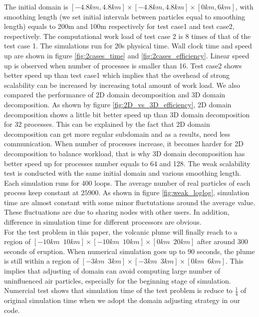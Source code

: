 \documentclass[conference,compsoc]{IEEEtran}
\begin{document}
%
The initial domain is $[-4.8km,4.8km]\times [-4.8km,4.8km] \times [0km, 6km]$, with smoothing length (we set initial intervals between particles equal to smoothing length) equals to 200m and 100m respectively for test case1 and test case2, respectively. The computational work load of test case 2 is 8 times of that of the test case 1. The simulations run for 20s physical time.  Wall clock time and speed up are shown in figure \ref{fig:2cases_time} and \ref{fig:2cases_efficiency}. Linear speed up is observed when number of processes is smaller than 16. Test case2 shows better speed up than test case1 which implies that the overhead of strong scalability can be increased by increasing total amount of work load. We also compared the performance of 2D domain decomposition and 3D domain decomposition. As shown by figure \ref{fig:2D_vs_3D_efficiency}, 2D domain decomposition shows a little bit better speed up than 3D domain decomposition for 32 processes. This can be explained by the fact that 2D domain decomposition can get more regular subdomain and as a results, need less communication. When number of processes increase, it becomes harder for 2D decomposition to balance workload, that is why 3D domain decomposition has better speed up for processes number equals to 64 and 128. The weak scalability test is conducted with the same initial domain and various smoothing length. Each simulation runs for 400 loops. The average number of real particles of each process keep constant at $25900$. As shown in figure \ref{fig:weak_loglog}, simulation time are almost constant with some minor fluctutations around the average value. These fluctuations are due to sharing nodes with other users. In addition, difference in simulation time for different processors are obvious.\\
%
%
For the test problem in this paper, the volcanic plume will finally reach to a region of $[-10km \,\,\, 10km] \times [-10km\,\,\,10km] \times [0km\,\,\,20km]$ after around 300 seconds of eruption. When numerical simulation goes up to 90 seconds, the plume is still within a region of $[-3km\,\,\,3km] \times [-3km\,\,\,3km] \times [0km\,\,\,6km]$. This implies that adjusting of domain can avoid computing large number of uninfluenced air particles, especially for the beginning stage of simulation. Numercial test shows that simulation time of the test problem is reduce to $\frac{1}{4}$ of original simulation time when we adopt the domain adjusting strategy in our code. 
\end{document}
